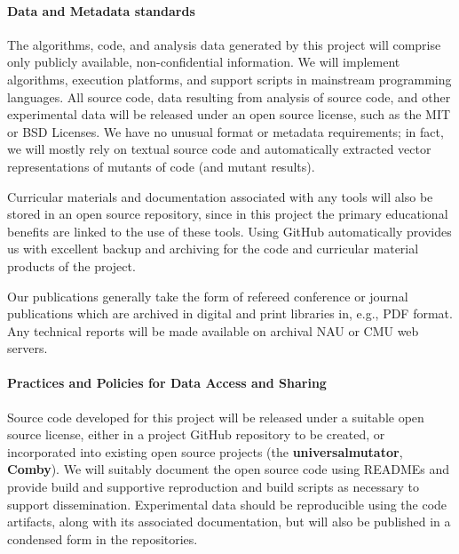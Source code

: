\documentclass[11pt]{article}
\begin{document}

\paragraph{Data and Metadata standards}
The algorithms, code, and analysis data generated by this project will comprise
only publicly available, non-confidential information. We will implement
algorithms, execution platforms, and support scripts in mainstream programming
languages.  All source code, data resulting from analysis of source code, and
other experimental data will be released under an open source license, such as
the MIT or BSD Licenses.  We have no unusual format or metadata requirements; in
fact, we will mostly rely on textual source code and automatically extracted
vector representations of mutants of code (and mutant results).

Curricular materials and documentation associated with any tools will also be
stored in an open source repository, since in this project the primary
educational benefits are linked to the use of these tools.  Using GitHub
automatically provides us with excellent backup and archiving for the code and
curricular material products of the project.

Our publications generally take the form of refereed conference or journal
publications which are archived in digital and print libraries in, e.g., PDF
format. Any technical reports will be made available on archival NAU or CMU web
servers.


\paragraph{Practices and Policies for Data Access and Sharing}
Source code developed for this project will be released under a suitable open
source license, either in a project GitHub repository to be created, or
incorporated into existing open source projects (the {\bf universalmutator},
{\bf Comby}). We will suitably document the open source code using READMEs and
provide build and supportive reproduction and build scripts as necessary to
support dissemination.  Experimental data should be reproducible using the code
artifacts, along with its associated documentation, but will also be published
in a condensed form in the repositories.
\end{document}
